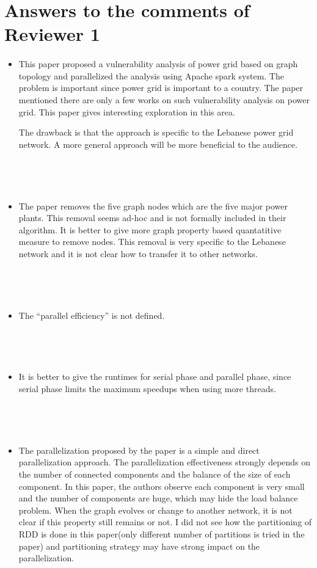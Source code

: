 \section{Answers to the comments of Reviewer 1}

\paragraph{}
\begin{itemize}
\item This paper proposed a vulnerability analysis of power grid based on graph topology and parallelized the analysis using Apache spark system. The problem is important since power grid is important to a country. The paper mentioned there are only a few works on such vulnerability analysis on power grid. This paper gives interesting exploration in this area. 

The drawback is that the approach is specific to the Lebanese power grid network. A more general approach will be more beneficial to the audience.

~


~

\item The paper removes the five graph nodes which are the five major power plants. This removal seems  ad-hoc and is not formally included in their algorithm. It is better to give more graph property based quantatitive measure to remove nodes. This removal is very specific to the Lebanese network and it is not clear how to transfer it to other networks.

~


~


\item The ``parallel efficiency'' is not defined.

~


~


\item It is better to give the runtimes for serial phase and parallel phase, since serial phase limits the maximum speedups when using more threads. 

~


~


\item The parallelization proposed by the paper is a simple and direct parallelization approach. The parallelization effectiveness strongly depends on the number of connected components and the balance of the size of each component. In this paper, the authors observe each component is very small and the number of components are huge, which may hide the load balance problem. When the graph evolves or change to another network, it is not clear if this property still remains or not.
I did not see how the partitioning of RDD is done in this paper(only different number of partitions is tried in the paper) and partitioning strategy may have strong impact on the parallelization.


\end{itemize}
